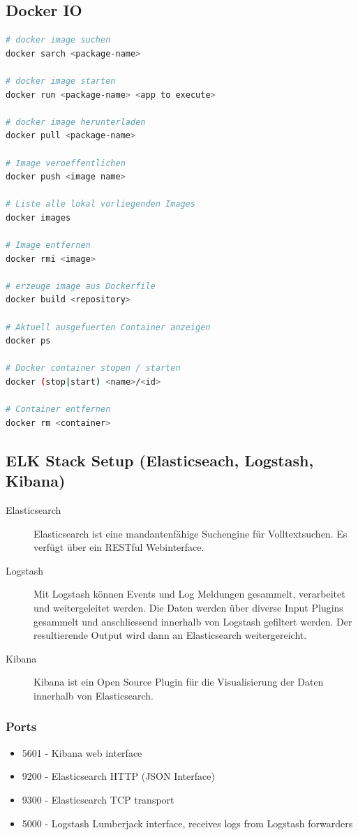 \subsection{Docker IO}
\begin{lstlisting}[language=bash]
# docker image suchen
docker sarch <package-name>

# docker image starten
docker run <package-name> <app to execute>

# docker image herunterladen
docker pull <package-name>

# Image veroeffentlichen
docker push <image name>

# Liste alle lokal vorliegenden Images
docker images

# Image entfernen
docker rmi <image>

# erzeuge image aus Dockerfile
docker build <repository>

# Aktuell ausgefuerten Container anzeigen
docker ps

# Docker container stopen / starten
docker (stop|start) <name>/<id>

# Container entfernen
docker rm <container>
\end{lstlisting}

\subsection{ELK Stack Setup (Elasticseach, Logstash, Kibana)}
\begin{description}
	\item[Elasticsearch] Elasticsearch ist eine mandantenfähige Suchengine für Volltextsuchen. Es verfügt über ein RESTful Webinterface.
	\item[Logstash] Mit Logstash können Events und Log Meldungen gesammelt, verarbeitet und weitergeleitet werden. Die Daten werden über diverse Input Plugins gesammelt und anschliessend innerhalb von Logstash gefiltert werden. Der resultierende Output wird dann an Elasticsearch weitergereicht.
	\item[Kibana] Kibana ist ein Open Source Plugin für die Visualisierung der Daten innerhalb von Elasticsearch. 
\end{description}

\subsubsection{Ports}
\begin{itemize}
	\item 5601 - Kibana web interface
	\item 9200 - Elasticsearch HTTP (JSON Interface)
	\item 9300 - Elasticsearch TCP transport
	\item 5000 - Logstash Lumberjack interface, receives logs from Logstash forwarders
\end{itemize}

